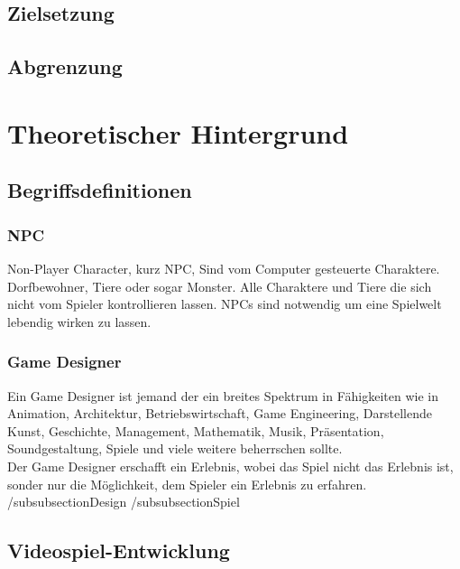 \documentclass[12pt,a4paper,bibliography=totocnumbered,listof=totocnumbered]{scrartcl}
\begin{document}
\subsection{Zielsetzung}
\subsection{Abgrenzung}

\section{Theoretischer Hintergrund}
\subsection{Begriffsdefinitionen}%
\subsubsection{NPC}%
Non-Player Character, kurz NPC, Sind vom Computer gesteuerte Charaktere. Dorfbewohner, Tiere oder sogar Monster. Alle Charaktere und Tiere die sich nicht vom Spieler kontrollieren lassen. NPCs sind notwendig um eine Spielwelt lebendig wirken zu lassen.
\subsubsection{Game Designer} %
Ein Game Designer ist jemand der ein breites Spektrum in Fähigkeiten wie in Animation, Architektur, Betriebswirtschaft, Game Engineering, Darstellende Kunst, Geschichte, Management, Mathematik, Musik, Präsentation, Soundgestaltung, Spiele und viele weitere beherrschen sollte.\\
Der Game Designer erschafft ein Erlebnis, wobei das Spiel nicht das Erlebnis ist, sonder nur die Möglichkeit, dem Spieler ein Erlebnis zu erfahren.
/subsubsection{Design}%
/subsubsection{Spiel}%
\subsection{Videospiel-Entwicklung}
\end{document}
